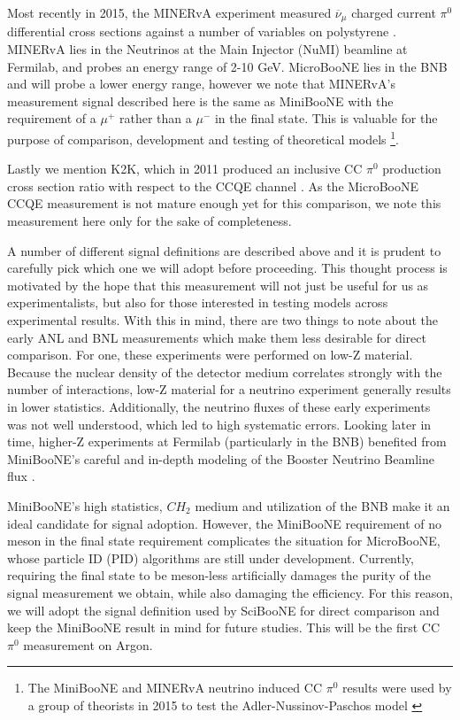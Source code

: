 \documentclass[12pt]{article}
\begin{document}
\par Most recently in 2015, the MINERvA experiment measured $\overline{\nu}_\mu$ charged current $\pi^0$ differential cross sections against a number of variables on polystyrene \cite{bib:minerva_thesis} \cite{bib:minerva_paper}.  MINERvA lies in the Neutrinos at the Main Injector (NuMI) beamline at Fermilab, and probes an energy range of 2-10 GeV.  MicroBooNE lies in the BNB and will probe a lower energy range, however we note that MINERvA's measurement signal described here is the same as MiniBooNE with the requirement of a $\mu^+$ rather than a $\mu^-$ in the final state. This is valuable for the purpose of comparison, development and testing of theoretical models \footnote{The MiniBooNE and MINERvA neutrino induced CC $\pi^0$ results were used by a group of theorists in 2015 to test the Adler-Nussinov-Paschos model \cite{bib:min_compare}}.
\par Lastly we mention K2K, which in 2011 produced an inclusive CC $\pi^0$ production cross section ratio with respect to the CCQE channel \cite{bib:k2k_paper}. As the MicroBooNE CCQE measurement is not mature enough yet for this comparison, we note this measurement here only for the sake of completeness.  
\par A number of different signal definitions are described above and it is prudent to carefully pick which one we will adopt before proceeding. This thought process is motivated by the hope that this measurement will not just be useful for us as experimentalists, but also for those interested in testing models across experimental results.  With this in mind, there are two things to note about the early ANL and BNL measurements which make them less desirable for direct comparison. For one, these experiments were performed on low-Z material. Because the nuclear density of the detector medium correlates strongly with the number of interactions, low-Z material for a neutrino experiment generally results in lower statistics. Additionally, the neutrino fluxes of these early experiments was not well understood, which led to high systematic errors. Looking later in time, higher-Z experiments at Fermilab (particularly in the BNB) benefited from MiniBooNE's careful and in-depth modeling of the Booster Neutrino Beamline flux \cite{bib:bnbflux}.
\par MiniBooNE's high statistics, $CH_2$ medium and utilization of the BNB make it an ideal candidate for signal adoption.  However, the MiniBooNE requirement of no meson in the final state requirement complicates the situation for MicroBooNE, whose particle ID (PID) algorithms are still under development.  Currently, requiring the final state to be meson-less artificially damages the purity of the signal measurement we obtain, while also damaging the efficiency. For this reason, we will adopt the signal definition used by SciBooNE for direct comparison and keep the MiniBooNE result in mind for future studies.  This will be the first CC $\pi^0$ measurement on Argon.
\end{document}
